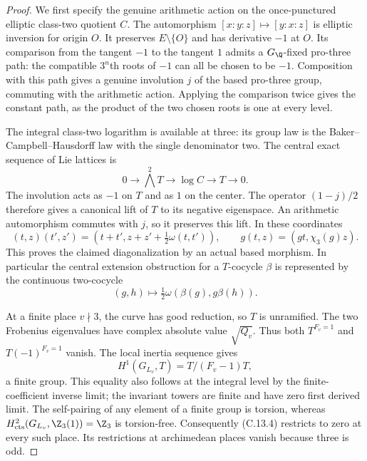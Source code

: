 \begin{proof}
We first specify the genuine arithmetic action on the
once-punctured elliptic class-two quotient $C$. The
automorphism $[x:y:z]\mapsto[y:x:z]$ is elliptic inversion
for origin $O$. It preserves $E\setminus\{O\}$ and has
derivative $-1$ at $O$. Its comparison from the tangent
$-1$ to the tangent $1$ admits a $G_\Q$-fixed pro-three
path: the compatible $3^n$th roots of $-1$ can all be
chosen to be $-1$. Composition with this path gives a
genuine involution $j$ of the based pro-three group,
commuting with the arithmetic action. Applying the
comparison twice gives the constant path, as the product
of the two chosen roots is one at every level.

The integral class-two logarithm is available at three:
its group law is the Baker--Campbell--Hausdorff law with
the single denominator two. The central exact sequence
of Lie lattices is
\[
 0\longrightarrow\bigwedge^2T\longrightarrow\log C
       \longrightarrow T\longrightarrow0.
\]
The involution acts as $-1$ on $T$ and as $1$ on the
center. The operator $(1-j)/2$ therefore gives a
canonical lift of $T$ to its negative eigenspace.
An arithmetic automorphism commutes with $j$, so it
preserves this lift. In these coordinates
\[
 (t,z)(t',z')=(t+t',z+z'+\tfrac12\omega(t,t')),
 \qquad g(t,z)=(g t,\chi_3(g)z).
 \tag{C.13.3}
\]
This proves the claimed diagonalization by an actual
based morphism. In particular the central extension
obstruction for a $T$-cocycle $\beta$ is represented by
the continuous two-cocycle
\[
 (g,h)\longmapsto\tfrac12\omega(\beta(g),g\beta(h)).
 \tag{C.13.4}
\]

At a finite place $v\nmid3$, the curve has good reduction,
so $T$ is unramified. The two Frobenius eigenvalues have
complex absolute value $\sqrt{Q_v}$. Thus both
$T^{F_v=1}$ and $T(-1)^{F_v=1}$ vanish. The local
inertia sequence gives
\[
 H^1(G_{L_v},T)=T/(F_v-1)T,
\]
a finite group. This equality also follows at the
integral level by the finite-coefficient inverse limit;
the invariant towers are finite and have zero first
derived limit. The self-pairing of any element of a
finite group is torsion, whereas
$H^2_{\rm cts}(G_{L_v},\Z_3(1))=\Z_3$ is torsion-free.
Consequently (C.13.4) restricts to zero at every such
place. Its restrictions at archimedean places vanish
because three is odd.


\end{proof}
